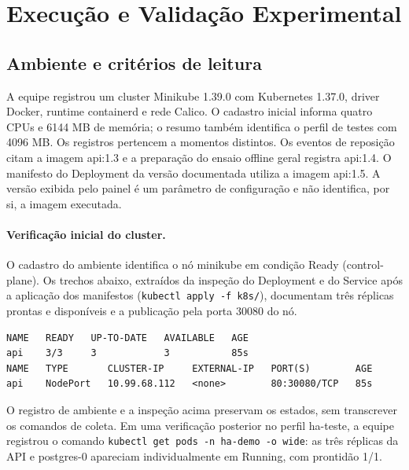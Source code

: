 \FloatBarrier\section{Execução e Validação Experimental}
\FloatBarrier\subsection{Ambiente e critérios de leitura}
A equipe registrou um cluster Minikube 1.39.0 com Kubernetes 1.37.0, driver Docker, runtime containerd e rede Calico. O cadastro inicial informa quatro CPUs e 6144 MB de memória; o resumo também identifica o perfil de testes com 4096 MB. Os registros pertencem a momentos distintos. Os eventos de reposição citam a imagem api:1.3 e a preparação do ensaio offline geral registra api:1.4. O manifesto do Deployment da versão documentada utiliza a imagem api:1.5. A versão exibida pelo painel é um parâmetro de configuração e não identifica, por si, a imagem executada.

\paragraph{Verificação inicial do cluster.} O cadastro do ambiente identifica o nó minikube em condição Ready (control-plane). Os trechos abaixo, extraídos da inspeção do Deployment e do Service após a aplicação dos manifestos (\texttt{kubectl apply -f k8s/}), documentam três réplicas prontas e disponíveis e a publicação pela porta 30080 do nó.
\par\noindent\begin{minipage}{\linewidth}\begin{lstlisting}
NAME   READY   UP-TO-DATE   AVAILABLE   AGE
api    3/3     3            3           85s
NAME   TYPE       CLUSTER-IP     EXTERNAL-IP   PORT(S)        AGE
api    NodePort   10.99.68.112   <none>        80:30080/TCP   85s
\end{lstlisting}
\end{minipage}\par
O registro de ambiente e a inspeção acima preservam os estados, sem transcrever os comandos de coleta. Em uma verificação posterior no perfil ha-teste, a equipe registrou o comando \texttt{kubectl get pods -n ha-demo -o wide}: as três réplicas da API e postgres-0 apareciam individualmente em Running, com prontidão 1/1.

